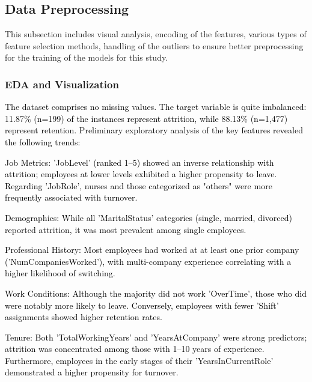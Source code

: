 \documentclass[a4paper,fleqn]{cas-sc}
\begin{document}
\subsection{Data Preprocessing}
This subsection includes visual analysis, encoding of the features, various types of feature selection methods, handling of the outliers to ensure better preprocessing for the training of the models for this study.

\subsubsection{EDA and Visualization}
\textcolor{black}{
The dataset \cite{KaggleHealthcareAttrition} comprises no missing values. The target variable is quite imbalanced: 11.87\% (n=199) of the instances represent attrition, while 88.13\% (n=1,477) represent retention. Preliminary exploratory analysis of the key features revealed the following trends:}

\textcolor{black}{Job Metrics: 'JobLevel' (ranked 1–5) showed an inverse relationship with attrition; employees at lower levels exhibited a higher propensity to leave. Regarding 'JobRole', nurses and those categorized as "others" were more frequently associated with turnover.}

\textcolor{black}{Demographics: While all 'MaritalStatus' categories (single, married, divorced) reported attrition, it was most prevalent among single employees.}

\textcolor{black}{Professional History: Most employees had worked at at least one prior company ('NumCompaniesWorked'), with multi-company experience correlating with a higher likelihood of switching.}

\textcolor{black}{Work Conditions: Although the majority did not work 'OverTime', those who did were notably more likely to leave. Conversely, employees with fewer 'Shift' assignments showed higher retention rates.}

\textcolor{black}{Tenure: Both 'TotalWorkingYears' and 'YearsAtCompany' were strong predictors; attrition was concentrated among those with 1–10 years of experience. Furthermore, employees in the early stages of their 'YearsInCurrentRole' demonstrated a higher propensity for turnover.}
\end{document}
